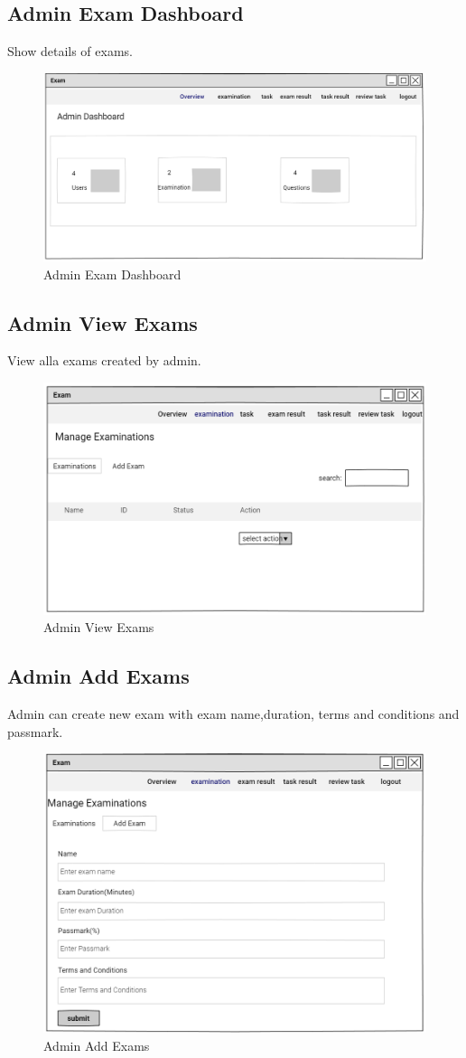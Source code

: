 \documentclass[a4paper,12pt]{report}
\begin{document}
\subsection {Admin Exam Dashboard}
Show details of exams.
\begin{figure}[bph]
	\centering
	\includegraphics[width=.6\linewidth]{img/admin/overview}
	\caption{Admin Exam Dashboard}
\end{figure}
\pagebreak

\subsection {Admin View  Exams}
View alla exams created by admin.
\begin{figure}[bph]
	\centering
	\includegraphics[width=.5\linewidth]{img/admin/e1}
	\caption{Admin View  Exams}
\end{figure}
\subsection {Admin Add Exams}
Admin can create new exam with exam name,duration, terms and conditions and passmark.
\begin{figure}[bph]
	\centering
	\includegraphics[width=.5\linewidth]{img/admin/add_exam}
	\caption{Admin Add Exams}
\end{figure}
\pagebreak
\end{document}

